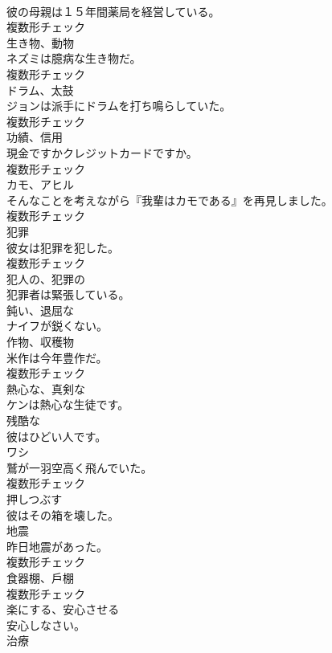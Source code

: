 \documentclass[8pt]{extreport}
\begin{document}
\begin{CJK}{UTF8}{min}
\\	彼の母親は１５年間薬局を経営している。	
\\	複数形チェック
\\	[名詞]	生き物、動物	
\\	ネズミは臆病な生き物だ。	
\\	複数形チェック
\\	[名詞]	ドラム、太鼓	
\\	ジョンは派手にドラムを打ち鳴らしていた。	
\\	複数形チェック
\\	[名詞]	功績、信用	
\\	現金ですかクレジットカードですか。	
\\	複数形チェック
\\	[名詞]	カモ、アヒル	
\\	そんなことを考えながら『我輩はカモである』を再見しました。	
\\	複数形チェック
\\	[名詞]	犯罪	
\\	彼女は犯罪を犯した。	
\\	複数形チェック
\\	[形容詞]	犯人の、犯罪の	
\\	犯罪者は緊張している。	
\\	[形容詞]	鈍い、退屈な	
\\	ナイフが鋭くない。	
\\	[名詞]	作物、収穫物	
\\	米作は今年豊作だ。	
\\	複数形チェック
\\	[形容詞]	熱心な、真剣な	
\\	ケンは熱心な生徒です。	
\\	[形容詞]	残酷な	
\\	彼はひどい人です。	
\\	[名詞]	ワシ	
\\	鷲が一羽空高く飛んでいた。	
\\	複数形チェック
\\	[動詞]	押しつぶす	
\\	彼はその箱を壊した。	
\\	[名詞]	地震	
\\	昨日地震があった。	
\\	複数形チェック
\\	[名詞]	食器棚、戶棚	
\\	複数形チェック
\\	[動詞]	楽にする、安心させる	
\\	安心しなさい。	
\\	[名詞]	治療	

\end{CJK}
\end{document}
